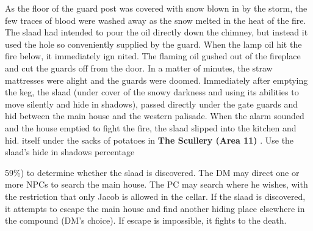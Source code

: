 \documentclass[a5paper,11pt,twoside]{book}
\newcommand{\MapText}[1]{
	{\color{DarkCyan} \textbf{#1}}
}
\begin{document}
{{{{As the floor of the guard post was covered with snow blown in by the storm, the few traces of blood were washed away as the snow melted in the heat of the fire.
The slaad had intended to pour the oil directly down the chimney, but instead it used the hole so conveniently supplied by the guard.
When the lamp oil hit the fire below, it immediately ign nited.
The flaming oil gushed out of the fireplace and cut the guards off from the door.
In a matter of minutes, the straw mattresses were alight and the guards were doomed.
Immediately after emptying the keg, the slaad (under cover of the snowy darkness and using its abilities to move silently and hide in shadows), passed directly under the gate guards and hid between the main house and the western palisade.
When the alarm sounded and the house emptied to fight the fire, the slaad slipped into the  kitchen and hid.
itself under the sacks of potatoes in \MapText{The Scullery (Area 11)}.
Use the slaad’s hide in shadows percentage {59\%) to determine whether the slaad is discovered.
The DM may direct one or more NPCs to search the main house.
The PC may search where he wishes, with the restriction that only Jacob is allowed in the cellar.
If the slaad is discovered, it attempts to escape the main house and find another hiding place elsewhere in the compound (DM’s choice).
If escape is impossible, it fights to the death.

}}}}}
\end{document}
